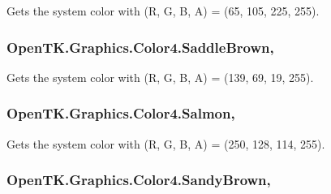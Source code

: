 Gets the system color with (R, G, B, A) = (65, 105, 225, 255). 

\hypertarget{struct_open_t_k_1_1_graphics_1_1_color4_a33687f7cc71c2a6f4e2b40cdad224f58}{
\subsubsection[{Saddle\-Brown}]{ Open\-T\-K.\-Graphics.\-Color4.\-Saddle\-Brown\hspace{0.3cm}{\ttfamily [static]}, {\ttfamily [get]}}}\label{struct_open_t_k_1_1_graphics_1_1_color4_a33687f7cc71c2a6f4e2b40cdad224f58}


Gets the system color with (R, G, B, A) = (139, 69, 19, 255). 

\hypertarget{struct_open_t_k_1_1_graphics_1_1_color4_a1bf4bea58618a3839a457cf15c4c5856}{
\subsubsection[{Salmon}]{ Open\-T\-K.\-Graphics.\-Color4.\-Salmon\hspace{0.3cm}{\ttfamily [static]}, {\ttfamily [get]}}}\label{struct_open_t_k_1_1_graphics_1_1_color4_a1bf4bea58618a3839a457cf15c4c5856}


Gets the system color with (R, G, B, A) = (250, 128, 114, 255). 

\hypertarget{struct_open_t_k_1_1_graphics_1_1_color4_a9d74b6be14388c375a57e2c7af55b016}{
\subsubsection[{Sandy\-Brown}]{ Open\-T\-K.\-Graphics.\-Color4.\-Sandy\-Brown\hspace{0.3cm}{\ttfamily [static]}, {\ttfamily [get]}}}\label{struct_open_t_k_1_1_graphics_1_1_color4_a9d74b6be14388c375a57e2c7af55b016}


